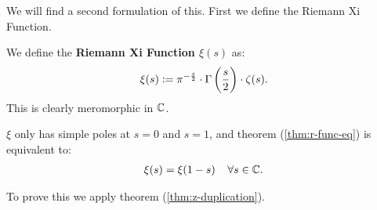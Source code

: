 We will find a second formulation of this. First we define the Riemann Xi Function.




\begin{definition}
We define the \textbf{Riemann Xi Function $\xi(s)$} as:
\begin{align*}
    \xi(s) \vcentcolon = \pi^{-\frac{s}{2}} \cdot \Gamma\left( \frac{s}{2} \right) \cdot \zeta(s).
\end{align*}
This is clearly meromorphic in $\mathbb{C}$.
\end{definition}


\begin{theorem}
$\xi$ only has simple poles at $s= 0$ and $s=1$, and theorem (\ref{thm:r-func-eq}) is equivalent to:
\begin{align*}
    \xi(s) = \xi(1-s) \;\;\;\; \forall s \in \mathbb{C}.
\end{align*}
\end{theorem}

To prove this we apply theorem (\ref{thm:z-duplication}).

